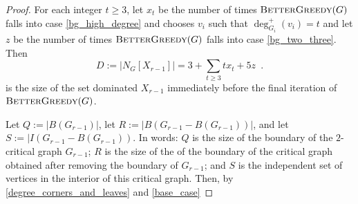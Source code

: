 \documentclass[12pt]{article}
\theoremstyle{definition}
\begin{document}
\begin{proof}
  For each integer $t\ge 3$, let $x_t$ be the number of times $\textsc{BetterGreedy}(G)$ falls into case \cref{bg_high_degree} and chooses $v_i$ such that $\deg^+_{G_i}(v_i)=t$ and let $z$ be the number of times $\textsc{BetterGreedy}(G)$ falls into case \cref{bg_two_three}.  Then
  \[
     D:=\left|N_G[X_{r-1}]\right| = 3 + \sum_{t\ge 3}tx_t + 5z \enspace .
  \]
  is the size of the set dominated $X_{r-1}$ immediately before the final iteration of $\textsc{BetterGreedy}(G)$.

  Let $Q:=|B(G_{r-1})|$, let $R:=|B(G_{r-1}-B(G_{r-1}))|$, and let $S:=|I(G_{r-1}-B(G_{r-1}))$.  In words: $Q$ is the size of the boundary of the $2$-critical graph $G_{r-1}$; $R$ is the size of the of the boundary of the critical graph obtained after removing the boundary of $G_{r-1}$; and $S$ is the independent set of vertices in the interior of this critical graph.
  Then, by \cref{degree_corners_and_leaves} and \cref{base_case}


\end{proof}
\end{document}
